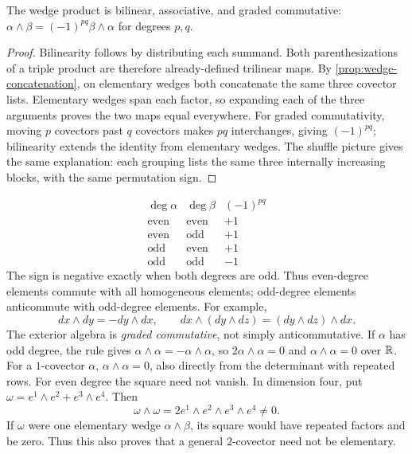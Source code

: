 \begin{proposition}
\label{prop:wedge-rules}
The wedge product is bilinear, associative, and graded commutative:
$\alpha\wedge\beta=(-1)^{pq}\beta\wedge\alpha$ for degrees $p,q$.
\end{proposition}
\begin{proof}
Bilinearity follows by distributing each summand. Both parenthesizations
of a triple product are therefore already-defined trilinear maps.
By \cref{prop:wedge-concatenation}, on elementary wedges both
concatenate the same three covector lists.
Elementary wedges span each factor, so expanding each of the three
arguments proves the two maps equal everywhere. For graded commutativity,
moving $p$ covectors past $q$ covectors makes $pq$ interchanges, giving
$(-1)^{pq}$; bilinearity extends the identity from elementary wedges.
The shuffle picture gives the same explanation: each grouping lists the
same three internally increasing blocks, with the same permutation sign.
\end{proof}
\[
\begin{array}{c|c|c}
\deg\alpha&\deg\beta&(-1)^{pq}\\\hline
\text{even}&\text{even}&+1\\
\text{even}&\text{odd}&+1\\
\text{odd}&\text{even}&+1\\
\text{odd}&\text{odd}&-1
\end{array}
\]
The sign is negative exactly when both degrees are odd. Thus even-degree
elements commute with all homogeneous elements; odd-degree elements
anticommute with odd-degree elements. For example,
\[
dx\wedge dy=-dy\wedge dx,\qquad
dx\wedge(dy\wedge dz)=(dy\wedge dz)\wedge dx.
\]
The exterior algebra is \emph{graded commutative}, not simply
anticommutative. If $\alpha$ has odd degree, the rule gives
$\alpha\wedge\alpha=-\alpha\wedge\alpha$, so
$2\alpha\wedge\alpha=0$ and $\alpha\wedge\alpha=0$ over $\mathbb{R}$.
For a $1$-covector $\alpha$, $\alpha\wedge\alpha=0$, also directly
from the determinant with repeated rows. For even degree the square need
not vanish. In dimension four, put
$\omega=e^1\wedge e^2+e^3\wedge e^4$. Then
\[
\omega\wedge\omega=2e^1\wedge e^2\wedge e^3\wedge e^4\ne0.
\]
If $\omega$ were one elementary wedge $\alpha\wedge\beta$, its square
would have repeated factors and be zero. Thus this also proves that a
general $2$-covector need not be elementary.

